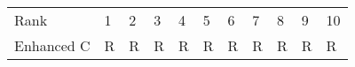 \begin{tabular}{lllllllllll}
Rank & 1 & 2 & 3 & 4 & 5 & 6 & 7 & 8 & 9 & 10 \\
Enhanced C & R & R & R & R & R & R & R & R & R & R \\
\end{tabular}
